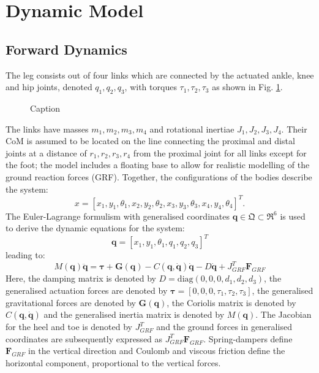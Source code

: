 \documentclass[letterpaper, 10 pt, conference]{ieeeconf}  %
\begin{document}
\section{Dynamic Model} \label{sec:dynamicModel}

\subsection{Forward Dynamics} 
The leg consists out of four links which are connected by the actuated ankle, knee and hip joints, denoted $q_1,q_2,q_3$, with torques $\tau_1,\tau_2,\tau_3$ as shown in Fig. \ref{fig:leg}. 
\begin{figure}[b]
	\centering
	\caption{Caption}
	\label{fig:leg}
\end{figure}
The links have masses $m_1,m_2,m_3,m_4$ and rotational inertiae $J_1,J_2,J_3,J_4$. Their CoM is assumed to be located on the line connecting the proximal and distal joints at a distance of $r_1,r_2,r_3,r_4$ from the proximal joint for all links except for the foot; the model includes a floating base to allow for realistic modelling of the ground reaction forces (GRF). Together, the configurations of the bodies describe the system:
 \begin{equation}
x = [x_1,y_1,\theta_1,x_2,y_2,\theta_2, x_3,y_3,\theta_3,x_4,y_4,\theta_4]^T. 
\end{equation}
The Euler-Lagrange formulism with generalised coordinates $\mathbf{q} \in \mathfrak{Q} \subset \mathfrak{R}^{6}$ is used to derive the dynamic equations for the system:
 \begin{equation}
\mathbf{q}=[x_1,y_1,\theta_1,q_1,q_2,q_3]^T \label{eq:q}
 \end{equation}
leading to:
 \begin{equation}
M(\mathbf{q})\mathbf{\ddot q} = \mathbf{\boldsymbol{\tau} + G(q)} - C\mathbf{(q,\dot q)\dot q -} D \mathbf{\dot q} + J_{GRF}^T \mathbf{F}_{GRF}  \label{eq:fwddyn}
 \end{equation}
Here, the damping matrix is denoted by $D = \text{diag} (0,0,0,d_1,d_2,d_3)$, the generalised actuation forces are denoted by $\boldsymbol{\tau} = [0,0,0,\tau_1,\tau_2,\tau_3]$, the generalised gravitational forces are denoted by $\mathbf{G(q)}$, the Coriolis matrix is denoted by $C\mathbf{(q, \dot q)}$ and the generalised inertia matrix is denoted by $M(\mathbf{q})$. The Jacobian for the heel and toe is denoted by $J_{GRF}^T$ and the ground forces in generalised coordinates are subsequently expressed as $J_{GRF}^T \mathbf{F}_{GRF}$. Spring-dampers define $\mathbf{F}_{GRF}$ in the vertical direction and Coulomb and viscous friction define the horizontal component, proportional to the vertical forces.
 
\end{document}
